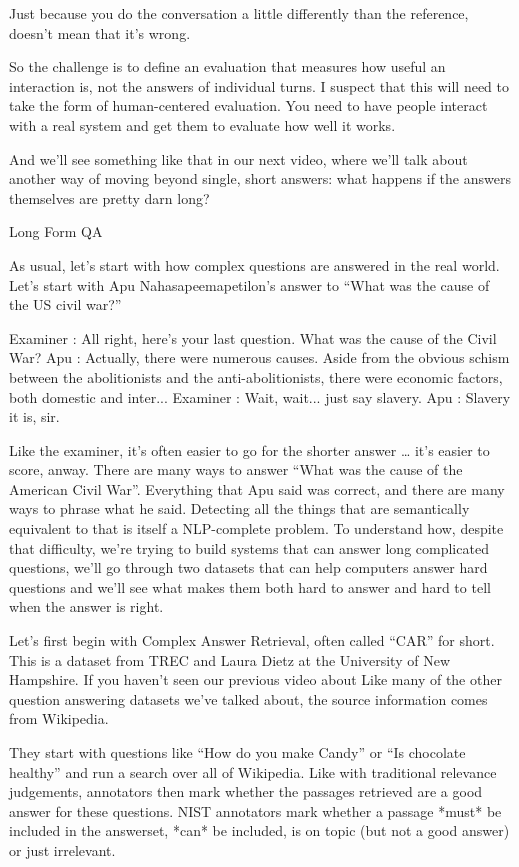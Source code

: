 Just because you do the conversation a little differently than the reference, doesn’t mean that it’s wrong.  

So the challenge is to define an evaluation that measures how useful an interaction is, not the answers of individual turns.  I suspect that this will need to take the form of human-centered evaluation.  You need to have people interact with a real system and get them to evaluate how well it works.

And we’ll see something like that in our next video, where we’ll talk about another way of moving beyond single, short answers: what happens if the answers themselves are pretty darn long?

Long Form QA


As usual, let’s start with how complex questions are answered in the real world.  Let’s start with Apu Nahasapeemapetilon’s answer to “What was the cause of the US civil war?”

Examiner : All right, here's your last question. What was the cause of the Civil War?
Apu : Actually, there were numerous causes. Aside from the obvious schism between the abolitionists and the anti-abolitionists, there were economic factors, both domestic and inter...
Examiner : Wait, wait... just say slavery.
Apu : Slavery it is, sir.


Like the examiner, it’s often easier to go for the shorter answer … it’s easier to score, anway.   There are many ways to answer “What was the cause of the American Civil War”.  Everything that Apu said was correct, and there are many ways to phrase what he said.  Detecting all the things that are semantically equivalent to that is itself a NLP-complete problem.  To understand how, despite that difficulty, we’re trying to build systems that can answer long complicated questions, we’ll go through two datasets that can help computers answer hard questions and we’ll see what makes them both hard to answer and hard to tell when the answer is right.

Let’s first begin with Complex Answer Retrieval, often called “CAR” for short.  This is a dataset from TREC and Laura Dietz at the University of New Hampshire.  If you haven’t seen our previous video about Like many of the other question answering datasets we’ve talked about, the source information comes from Wikipedia.  

They start with questions like “How do you make Candy” or “Is chocolate healthy” and run a search over all of Wikipedia.  Like with traditional relevance judgements, annotators then mark whether the passages retrieved are a good answer for these questions.  NIST annotators mark whether a passage *must* be included in the answerset, *can* be included, is on topic (but not a good answer) or just irrelevant. 

